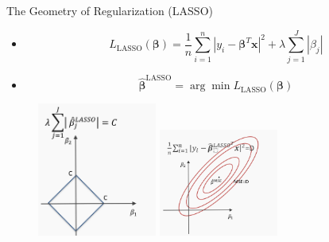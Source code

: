 \begin{frame}{The Geometry of Regularization (LASSO)}
    \begin{itemize}
        \item[] \[
        L_{\text{LASSO}}(\boldsymbol{\beta}) = \frac{1}{n} \sum_{i=1}^n \left| y_i - \boldsymbol{\beta}^T \mathbf{x} \right|^2 + \lambda \sum_{j=1}^J |\beta_j|
        \]
        \item[] \[
        \hat{\boldsymbol{\beta}}^{\text{LASSO}} = \arg\min L_{\text{LASSO}}(\boldsymbol{\beta})
        \]
    \end{itemize}

    \begin{figure}
        \centering
        \includegraphics[width=0.35\textwidth]{images/linear-regression/linear-regression-22.png}
        \includegraphics[width=0.35\textwidth]{images/linear-regression/linear-regression-23.png}
    \end{figure}
\end{frame}



